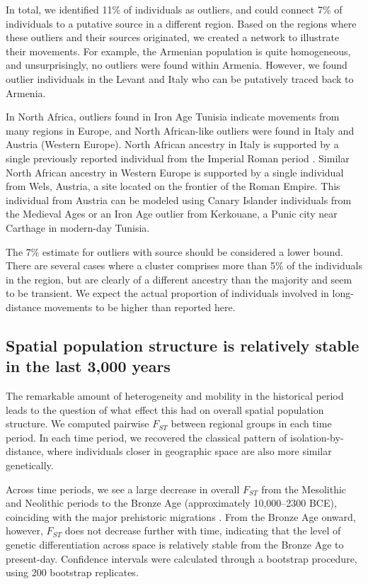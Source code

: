 \documentclass[11pt]{article}
\begin{document}
In total, we identified 11\% of individuals as outliers, and could connect 7\% of individuals to a putative source in a different region. Based on the regions where these outliers and their sources originated, we created a network to illustrate their movements. For example, the Armenian population is quite homogeneous, and unsurprisingly, no outliers were found within Armenia. However, we found outlier individuals in the Levant and Italy who can be putatively traced back to Armenia.

In North Africa, outliers found in Iron Age Tunisia \citep{moots2022} indicate movements from many regions in Europe, and North African-like outliers were found in Italy and Austria (Western Europe). North African ancestry in Italy is supported by a single previously reported individual from the Imperial Roman period \citep{antonio2019}. Similar North African ancestry in Western Europe is supported by a single individual from Wels, Austria, a site located on the frontier of the Roman Empire. This individual from Austria can be modeled using Canary Islander individuals from the Medieval Ages or an Iron Age outlier from Kerkouane, a Punic city near Carthage in modern-day Tunisia.

The 7\% estimate for outliers with source should be considered a lower bound. There are several cases where a cluster comprises more than 5\% of the individuals in the region, but are clearly of a different ancestry than the majority and seem to be transient. We expect the actual proportion of individuals involved in long-distance movements to be higher than reported here.

\subsection{Spatial population structure is relatively stable in the last 3,000 years}

The remarkable amount of heterogeneity and mobility in the historical period leads to the question of what effect this had on overall spatial population structure. We computed pairwise $F_{ST}$ \citep{bhatia2013} between regional groups in each time period. In each time period, we recovered the classical pattern of isolation-by-distance, where individuals closer in geographic space are also more similar genetically.

Across time periods, we see a large decrease in overall $F_{ST}$ from the Mesolithic and Neolithic periods to the Bronze Age (approximately 10,000--2300 BCE), coinciding with the major prehistoric migrations \citep{haak2015, lazaridis2014}. From the Bronze Age onward, however, $F_{ST}$ does not decrease further with time, indicating that the level of genetic differentiation across space is relatively stable from the Bronze Age to present-day. Confidence intervals were calculated through a bootstrap procedure, using 200 bootstrap replicates.
\end{document}
